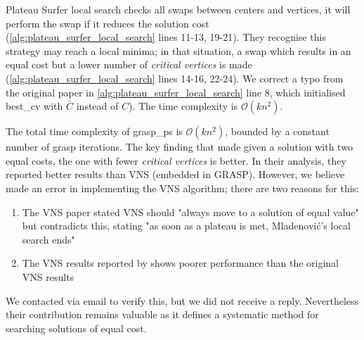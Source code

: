 



Plateau Surfer local search checks all swaps between centers and vertices, it will perform the swap if it reduces the solution cost (\cref{alg:plateau_surfer_local_search} lines 11-13, 19-21). They recognise this strategy may reach a local minima; in that situation, a swap which results in an equal cost but a lower number of \emph{critical vertices} is made (\cref{alg:plateau_surfer_local_search} lines 14-16, 22-24). We correct a typo from the original paper in \cref{alg:plateau_surfer_local_search} line 8, which initialised best\_cv with $\bar{C}$ instead of $C$). The time complexity is $\mathcal{O}(kn^2)$.

The total time complexity of \acrshort{grasp_ps} is $\mathcal{O}(kn^2)$, bounded by a constant number of \acrshort{grasp} iterations. The key finding that \textcite{battiti_new_2017} made given a solution with two equal costs, the one with fewer \emph{critical vertices} is better. In their analysis, they reported better results than VNS (embedded in GRASP). However, we believe \textcite{battiti_new_2017} made an error in implementing the VNS algorithm; there are two reasons for this:
\begin{enumerate}
    \item The VNS paper stated VNS should "always move to a
solution of equal value" but \citeauthor{battiti_new_2017} contradicts this, stating "as soon as a plateau is met, Mladenovi\'{c}’s local search ends"
    \item The VNS results reported by \citeauthor{battiti_new_2017} shows poorer performance than the original VNS results
\end{enumerate}

We contacted \citeauthor{battiti_new_2017} via email to verify this, but we did not receive a reply. Nevertheless their contribution remains valuable as it defines a systematic method for searching solutions of equal cost.